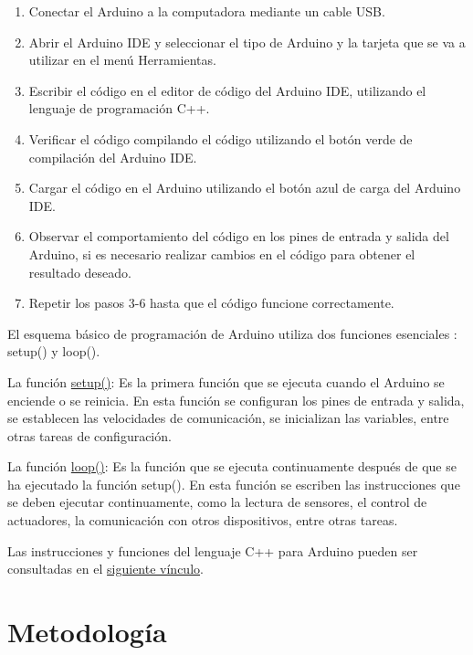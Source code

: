 \begin{enumerate}
	\item Conectar el Arduino a la computadora mediante un cable USB.
	\item Abrir el Arduino IDE y seleccionar el tipo de Arduino y la tarjeta que se va a utilizar en el menú Herramientas.
	\item Escribir el código en el editor de código del Arduino IDE, utilizando el lenguaje de programación C++.
	\item Verificar el código compilando el código utilizando el botón verde de compilación del Arduino IDE.
	\item Cargar el código en el Arduino utilizando el botón azul de carga del Arduino IDE.
	\item Observar el comportamiento del código en los pines de entrada y salida del Arduino, si es necesario realizar cambios en el código para obtener el resultado deseado.
	\item Repetir los pasos 3-6 hasta que el código funcione correctamente.

\end{enumerate}

El esquema básico de programación de Arduino utiliza dos funciones esenciales \cite{Margolis20}: setup() y loop().

La función \href{https://www.arduino.cc/reference/en/language/structure/sketch/setup/}{setup()}: Es la primera función que se ejecuta cuando el Arduino se enciende o se reinicia. En esta función se configuran los pines de entrada y salida, se establecen las velocidades de comunicación, se inicializan las variables, entre otras tareas de configuración. 

La función \href{https://www.arduino.cc/reference/en/language/structure/sketch/loop/}{loop()}: Es la función que se ejecuta continuamente después de que se ha ejecutado la función setup(). En esta función se escriben las instrucciones que se deben ejecutar continuamente, como la lectura de sensores, el control de actuadores, la comunicación con otros dispositivos, entre otras tareas.

Las instrucciones y funciones del lenguaje C++ para Arduino pueden ser consultadas en el \href{https://www.arduino.cc/reference/en/}{siguiente vínculo}.

\section{Metodología}

